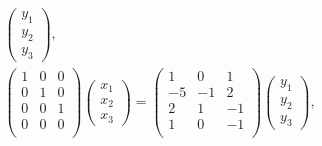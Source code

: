 \documentclass[12pt]{article}
\begin{document}
\begin{enumerate}
\begin{gather*}
            \begin{pmatrix}
                y_1 \\ y_2 \\ y_3
            \end{pmatrix} , \\
            \begin{pmatrix}
                1 & 0 & 0 \\
                0 & 1 & 0 \\
                0 & 0 & 1 \\
                0 & 0 & 0 \\
            \end{pmatrix}
            \begin{pmatrix}
                x_1 \\ x_2 \\ x_3
            \end{pmatrix}
            =
            \begin{pmatrix}
                1  & 0  & 1  \\
                -5 & -1 & 2  \\
                2  & 1  & -1 \\
                1  & 0  & -1 \\
            \end{pmatrix}
            \begin{pmatrix}
                y_1 \\ y_2 \\ y_3
            \end{pmatrix} , \\
        \end{gather*}


\end{enumerate}
\end{document}
